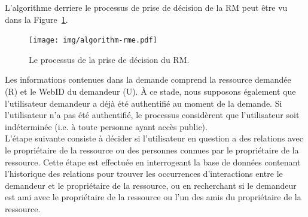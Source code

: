 \documentclass[a4paper]{article}
\begin{document}
L'algorithme derriere le processus de prise de décision de la RM peut être vu dans la Figure~\ref{fig:algorithm_rme}.\\

\begin{figure}[h]
  \begin{center}
    \texttt{[image: img/algorithm-rme.pdf]}
        \caption{Le processus de la prise de décision du RM.}
        \label{fig:algorithm_rme}
  \end{center}
\end{figure}

Les informations contenues dans la demande comprend la ressource demandée (R) et le WebID du demandeur (U). À ce stade, nous supposons également que l'utilisateur demandeur a déjà été authentifié au moment de la demande. Si l'utilisateur n'a pas été authentifié, le processus considèrent que l'utilisateur soit indéterminée (i.e. à toute personne ayant accès public).\\


L'étape suivante consiste à décider si l'utilisateur en question a des relations avec le propriétaire de la ressource ou des personnes connues par le propriétaire de la ressource. Cette étape est effectuée en interrogeant la base de données contenant l'historique des relations pour trouver les occurrences d'interactions entre le demandeur et le propriétaire de la ressource, ou en recherchant si le demandeur est ami avec le propriétaire de la ressource ou l'un des amis du propriétaire de la ressource.\\
\end{document}
